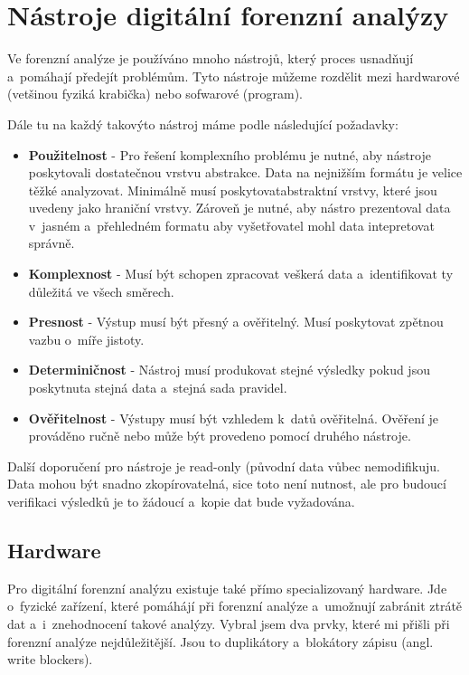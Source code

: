\documentclass[thesis=B,czech]{FITthesis}[2012/06/26]
\begin{document}
\chapter{Nástroje digitální forenzní analýzy} 
\label{body}
Ve forenzní analýze je používáno mnoho nástrojů, který proces usnadňují a~pomáhají předejít problémům. Tyto nástroje můžeme rozdělit mezi hardwarové (vetšinou fyziká krabička) nebo sofwarové (program).

Dále tu na každý takovýto nástroj máme podle \cite{for_need} následující požadavky:

\begin{itemize}
\item \textbf{Použitelnost} - Pro řešení komplexního problému je nutné, aby nástroje poskytovali dostatečnou vrstvu abstrakce. Data na nejnižším formátu je velice těžké analyzovat. Minimálně musí poskytovatabstraktní vrstvy, které jsou uvedeny jako hraniční vrstvy. Zároveň je nutné, aby nástro prezentoval data v~jasném a~přehledném formatu aby vyšetřovatel mohl data intepretovat správně. \cite{carrier2003defining}
\item \textbf{Komplexnost} - Musí být schopen zpracovat veškerá data a~identifikovat ty důležitá ve všech směrech.
\item \textbf{Presnost} - Výstup musí být přesný a ověřitelný. Musí poskytovat zpětnou vazbu o~míře jistoty.
\item \textbf{Determiničnost} - Nástroj musí produkovat stejné výsledky pokud jsou poskytnuta stejná data a~stejná sada pravidel.
\item \textbf{Ověřitelnost} - Výstupy musí být vzhledem k~datů ověřitelná. Ověření je prováděno ručně nebo může být provedeno pomocí druhého nástroje.
\end{itemize}

Další doporučení pro nástroje je read-only (původní data vůbec nemodifikuju. Data mohou být snadno zkopírovatelná, sice toto není nutnost, ale pro budoucí verifikaci výsledků je to žádoucí a~kopie dat bude vyžadována. 


\section{Hardware}
Pro digitální forenzní analýzu existuje také přímo specializovaný hardware. Jde o~fyzické zařízení, které pomáhájí při forenzní analýze a~umožnují zabránit ztrátě dat a~i~znehodnocení takové analýzy. Vybral jsem dva prvky, které mi přišli při forenzní analýze nejdůležitější. Jsou to duplikátory a~blokátory zápisu (angl. write blockers).
\end{document}

